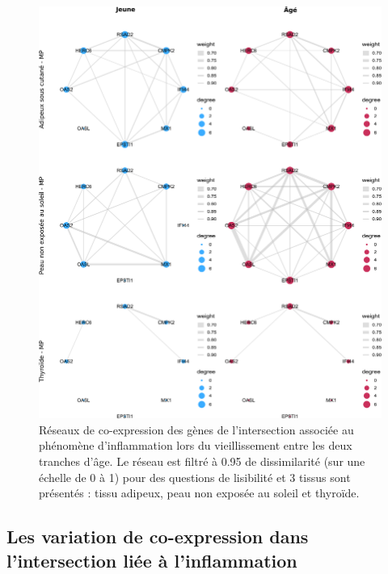 \begin{figure}[p]
    \centering
    \includegraphics[width=1\textwidth]{img/chap2/chap2_plot_intersect_inflammation.pdf}
    \caption[Réseaux de co-expression des gènes de l'intersection associée au phénomène d'inflammation lors du vieillissement entre les deux tranches d'âge]{Réseaux de co-expression des gènes de l'intersection associée au phénomène d'inflammation lors du vieillissement entre les deux tranches d'âge. Le réseau est filtré à 0.95 de dissimilarité (sur une échelle de 0 à 1) pour des questions de lisibilité et 3 tissus sont présentés : tissu adipeux, peau non exposée au soleil et thyroïde.}
    \label{figure:graphs_intersection_plot_adipo_skinnosun_thyr}
\end{figure}


\subsection{Les variation de co-expression dans l'intersection liée à l'inflammation}

